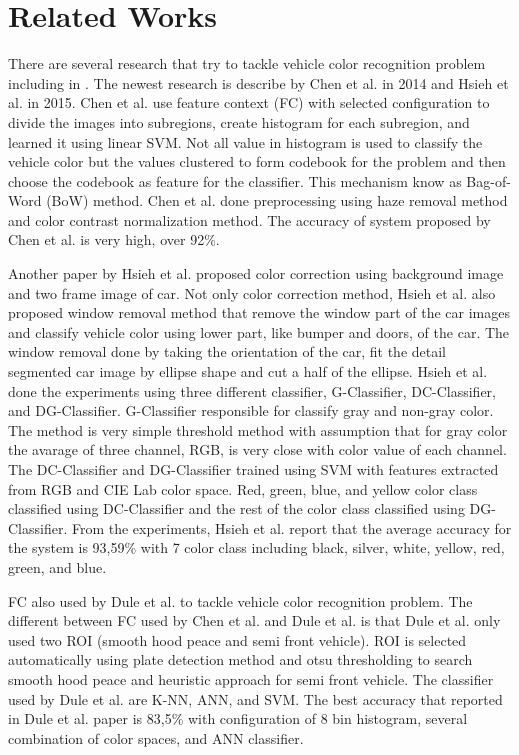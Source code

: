 \documentclass[conference]{IEEEtran}
\begin{document}
\section{Related Works}

There are several research that try to tackle vehicle color recognition problem including in \cite{hsieh,pchen,dule,baek,jwson}. The newest research is describe by Chen et al. \cite{pchen} in 2014 and Hsieh et al. \cite{hsieh} in 2015. Chen et al. use  feature context (FC) with selected configuration to divide the images into subregions, create histogram for each subregion, and learned it using linear SVM. Not all value in histogram is used to classify the vehicle color but the values clustered to form codebook for the problem and then choose the codebook as feature for the classifier. This mechanism know as Bag-of-Word (BoW) method. Chen et al. done preprocessing using haze removal method \cite{khe} and color contrast normalization method. The accuracy of system proposed by Chen et al. is very high, over 92\%. 

Another paper by Hsieh et al. \cite{hsieh} proposed color correction using background image and two frame image of car. Not only color correction method, Hsieh et al. also proposed window removal method that remove the window part of the car images and classify vehicle color using lower part, like bumper and doors, of the car. The window removal done by taking the orientation of the car, fit the detail segmented car image by ellipse shape and cut a half of the ellipse. Hsieh et al. done the experiments using three different classifier, G-Classifier, DC-Classifier, and DG-Classifier. G-Classifier responsible for classify gray and non-gray color. The method is very simple threshold method with assumption that for gray color the avarage of three channel, RGB, is very close with color value of each channel. The DC-Classifier and DG-Classifier trained using SVM with features extracted from RGB and CIE Lab color space. Red, green, blue, and yellow color class classified using DC-Classifier and the rest of the color class classified using DG-Classifier. From the experiments, Hsieh et al. report that the average accuracy for the system is 93,59\% with 7 color class including black, silver, white, yellow, red, green, and blue.

FC also used by Dule et al. \cite{dule} to tackle vehicle color recognition problem. The different between FC used by Chen et al. and Dule et al. is that Dule et al. only used two ROI (smooth hood peace and semi front vehicle). ROI is selected automatically using plate detection method and otsu thresholding to search smooth hood peace and heuristic approach for semi front vehicle. The classifier used by Dule et al. are K-NN, ANN, and SVM. The best accuracy that reported in Dule et al. paper is 83,5\% with configuration of 8 bin histogram, several combination of color spaces, and ANN classifier.   
\end{document}
